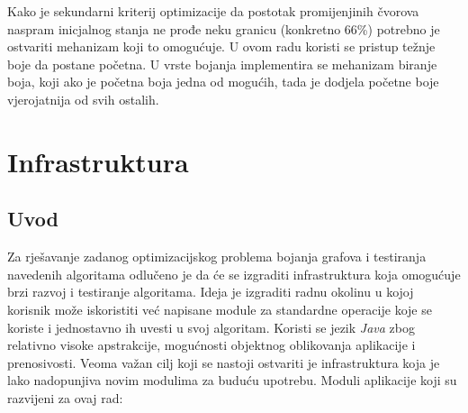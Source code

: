 \documentclass[times, utf8, diplomski, numeric]{fer}
\begin{document}
Kako je sekundarni kriterij optimizacije da postotak promijenjinih čvorova naspram inicjalnog stanja ne prođe neku granicu (konkretno 66\%) potrebno je ostvariti mehanizam koji to omogućuje. U ovom radu koristi se pristup težnje boje da postane početna. U vrste bojanja implementira se mehanizam biranje boja, koji ako je početna boja jedna od mogućih, tada je dodjela početne boje vjerojatnija od svih ostalih. 

\chapter{Infrastruktura}

\section{Uvod}

Za rješavanje zadanog optimizacijskog problema bojanja grafova i testiranja navedenih algoritama odlučeno je da će se izgraditi infrastruktura koja omogućuje brzi razvoj i testiranje algoritama. Ideja je izgraditi radnu okolinu u kojoj korisnik može iskoristiti već napisane module za standardne operacije koje se koriste i jednostavno ih uvesti u svoj algoritam. Koristi se jezik \emph{Java} zbog relativno visoke apstrakcije, mogućnosti objektnog oblikovanja aplikacije i prenosivosti. Veoma važan cilj koji se nastoji ostvariti je infrastruktura koja je lako nadopunjiva novim modulima za buduću upotrebu. Moduli aplikacije koji su razvijeni za ovaj rad:
\end{document}
